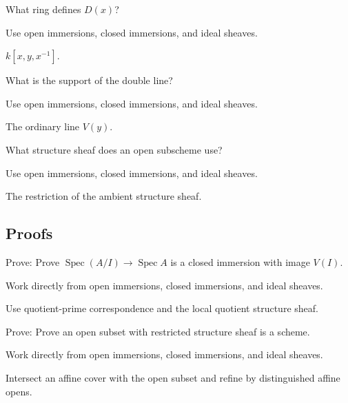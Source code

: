 \begin{exercise}\label{exr:vi22-expand-03}
What ring defines $D(x)$?
\end{exercise}
\begin{hint}
Use open immersions, closed immersions, and ideal sheaves.
\end{hint}
\begin{solution}
$k[x,y,x^{-1}]$.
\end{solution}

\begin{exercise}[Support]\label{exr:vi22-expand-04}
What is the support of the double line?
\end{exercise}
\begin{hint}
Use open immersions, closed immersions, and ideal sheaves.
\end{hint}
\begin{solution}
The ordinary line $V(y)$.
\end{solution}

\begin{exercise}\label{exr:vi22-expand-05}
What structure sheaf does an open subscheme use?
\end{exercise}
\begin{hint}
Use open immersions, closed immersions, and ideal sheaves.
\end{hint}
\begin{solution}
The restriction of the ambient structure sheaf.
\end{solution}

\subsection*{Proofs}

\begin{exercise}\label{exr:vi22-expand-06}
Prove: Prove $\operatorname{Spec}(A/I)\to\operatorname{Spec}A$ is a closed immersion with image $V(I)$.
\end{exercise}
\begin{hint}
Work directly from open immersions, closed immersions, and ideal sheaves.
\end{hint}
\begin{solution}
Use quotient-prime correspondence and the local quotient structure sheaf.
\end{solution}

\begin{exercise}\label{exr:vi22-expand-07}
Prove: Prove an open subset with restricted structure sheaf is a scheme.
\end{exercise}
\begin{hint}
Work directly from open immersions, closed immersions, and ideal sheaves.
\end{hint}
\begin{solution}
Intersect an affine cover with the open subset and refine by distinguished affine opens.
\end{solution}

